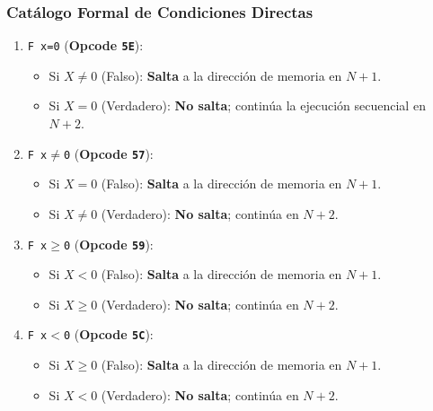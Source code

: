 \documentclass[11pt,a4paper]{article}
\begin{document}
\subsubsection{Catálogo Formal de Condiciones Directas}
\begin{enumerate}
    \item \texttt{F x=0} (\textbf{Opcode \texttt{5E}}):
    \begin{itemize}
        \item Si $X \ne 0$ (Falso): \textbf{Salta} a la dirección de memoria en $N+1$.
        \item Si $X = 0$ (Verdadero): \textbf{No salta}; continúa la ejecución secuencial en $N+2$.
    \end{itemize}
    \item \texttt{F x$\ne$0} (\textbf{Opcode \texttt{57}}):
    \begin{itemize}
        \item Si $X = 0$ (Falso): \textbf{Salta} a la dirección de memoria en $N+1$.
        \item Si $X \ne 0$ (Verdadero): \textbf{No salta}; continúa en $N+2$.
    \end{itemize}
    \item \texttt{F x$\ge$0} (\textbf{Opcode \texttt{59}}):
    \begin{itemize}
        \item Si $X < 0$ (Falso): \textbf{Salta} a la dirección de memoria en $N+1$.
        \item Si $X \ge 0$ (Verdadero): \textbf{No salta}; continúa en $N+2$.
    \end{itemize}
    \item \texttt{F x$<$0} (\textbf{Opcode \texttt{5C}}):
    \begin{itemize}
        \item Si $X \ge 0$ (Falso): \textbf{Salta} a la dirección de memoria en $N+1$.
        \item Si $X < 0$ (Verdadero): \textbf{No salta}; continúa en $N+2$.
    \end{itemize}
\end{enumerate}
\end{document}
